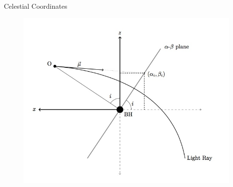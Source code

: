 \documentclass{beamer}
\begin{document}
\begin{frame}{Celestial Coordinates}
	\begin{center}
      \begin{figure}
      	\includegraphics[scale=0.35] {figures/celestialcoordinates2.jpeg}
      \end{figure}
	\end{center}	
\end{frame}
\end{document}
